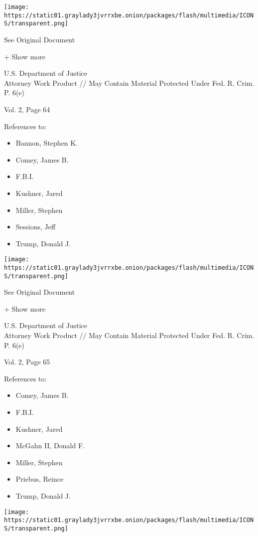 \protect\hyperlink{}{}

\texttt{[image: https://static01.graylady3jvrrxbe.onion/packages/flash/multimedia/ICONS/transparent.png]}

See Original Document

+ Show more

U.S. Department of Justice\\
Attorney Work Product // May Contain Material Protected Under Fed. R.
Crim. P. 6(e)

Vol. 2, Page 64

References to:

\begin{itemize}
\tightlist
\item
  Bannon, Stephen K.
\item
  Comey, James B.
\item
  F.B.I.
\item
  Kushner, Jared
\item
  Miller, Stephen
\item
  Sessions, Jeff
\item
  Trump, Donald J.
\end{itemize}

\protect\hyperlink{}{}

\texttt{[image: https://static01.graylady3jvrrxbe.onion/packages/flash/multimedia/ICONS/transparent.png]}

See Original Document

+ Show more

U.S. Department of Justice\\
Attorney Work Product // May Contain Material Protected Under Fed. R.
Crim. P. 6(e)

Vol. 2, Page 65

References to:

\begin{itemize}
\tightlist
\item
  Comey, James B.
\item
  F.B.I.
\item
  Kushner, Jared
\item
  McGahn II, Donald F.
\item
  Miller, Stephen
\item
  Priebus, Reince
\item
  Trump, Donald J.
\end{itemize}

\protect\hyperlink{}{}

\texttt{[image: https://static01.graylady3jvrrxbe.onion/packages/flash/multimedia/ICONS/transparent.png]}

